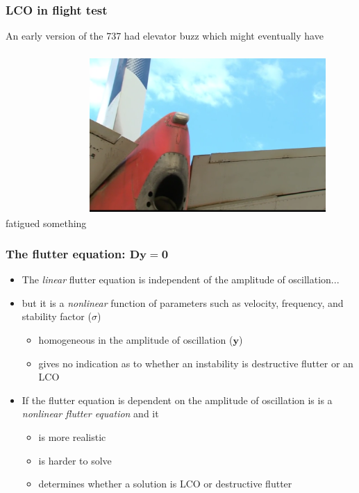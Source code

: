 \documentclass{beamer}
\newcommand{\Vector}[1]{\boldsymbol{#1}}
\begin{document}
\begin{frame}
	\frametitle{LCO in flight test}
	An early version of the 737 had elevator buzz which might eventually have fatigued something
 	\includegraphics[height=7cm,width=9cm]{tab.png}

\end{frame}

\begin{frame}
	\frametitle{The flutter equation: $\Vector{Dy} = \Vector{0}$}
	\begin{itemize}
		\item The \emph{linear} flutter equation is independent of the amplitude
			of oscillation...
		\item but it is a \emph{nonlinear} function of parameters
		   such as velocity, frequency, and stability factor ($\sigma$)
			\begin{itemize}
				\item homogeneous in the amplitude of oscillation ($\Vector{y}$)
				\item gives no indication as to whether an instability is destructive flutter
					or an LCO
			\end{itemize}
		\item If the flutter equation is dependent on the amplitude of oscillation is is
			a \emph{nonlinear flutter equation} and it
			\begin{itemize}
				\item is more realistic
				\item is harder to solve
				\item determines whether a solution is LCO or destructive flutter
			\end{itemize}
	\end{itemize}
\end{frame}
\end{document}
